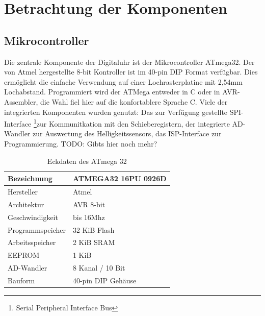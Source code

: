 \section{Betrachtung der Komponenten}
\subsection{Mikrocontroller}
Die zentrale Komponente der Digitaluhr ist der Mikrocontroller ATmega32. Der von Atmel hergestellte 8-bit Kontroller ist im 40-pin DIP Format verfügbar. Dies ermöglicht die einfache Verwendung auf einer Lochrasterplatine mit 2,54mm Lochabstand. Programmiert wird der ATMega entweder in C oder in AVR-Assembler, die Wahl fiel hier auf die konfortablere Sprache C.
Viele der integrierten Komponenten wurden genutzt: Das zur Verfügung gestellte SPI-Interface \footnote{Serial Peripheral Interface Bus}zur Kommunitkation mit den Schieberegistern, der integrierte AD-Wandler zur Auswertung des Helligkeitssensors, das ISP-Interface zur Programmierung. TODO: Gibts hier noch mehr?
\begin{table}[htp]
  \centering
  \renewcommand{\arraystretch}{1.2}
  \begin{tabular}{||l | l||}
  \hline\hline
  Bezeichnung&ATMEGA32 16PU 0926D\\\hline
  Hersteller&Atmel\\\hline
  Architektur&AVR 8-bit \\\hline
  Geschwindigkeit&bis 16Mhz \\\hline
  Programmspeicher&32 KiB Flash \\\hline
  Arbeitsspeicher&2 KiB SRAM \\\hline
  EEPROM&1 KiB \\\hline
  AD-Wandler&8 Kanal / 10 Bit \\\hline
  Bauform&40-pin DIP Gehäuse \\
  \hline\hline    
\end{tabular}
\caption{Eckdaten des ATmega 32}
\end{table}

